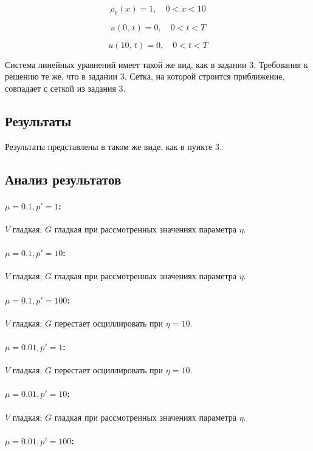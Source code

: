 \documentclass[12pt]{article}
\begin{document}
$$
\rho_0(x) = 1{,}\quad 0 < x < 10
$$

$$
u(0{,}\, t) = 0{,}\quad 0 < t < T 
$$

$$
u(10{,}\, t) = 0{,}\quad 0 < t < T 
$$

Система линейных уравнений имеет такой же вид, как в задании 3. Требования к решению те же, что в задании 3. Сетка, на которой строится приближение, совпадает с сеткой из задания 3.

\subsection{Результаты}

Результаты представлены в таком же виде, как в пункте 3.

\subsection{Анализ результатов}
\paragraph{$\mu = 0.1, p' = 1$:}

$V$ гладкая; $G$ гладкая при рассмотренных значениях параметра $\eta$.
\paragraph{$\mu = 0.1, p' = 10$:}

$V$ гладкая; $G$ гладкая при рассмотренных значениях параметра $\eta$.
\paragraph{$\mu = 0.1, p' = 100$:}

$V$ гладкая; $G$ перестает осциллировать при $\eta = 10$.
\paragraph{$\mu = 0.01, p' = 1$:}

$V$ гладкая; $G$ перестает осциллировать при $\eta = 10$.
\paragraph{$\mu = 0.01, p' = 10$:}

$V$ гладкая; $G$ гладкая при рассмотренных значениях параметра $\eta$.
\paragraph{$\mu = 0.01, p' = 100$:}
\end{document}
